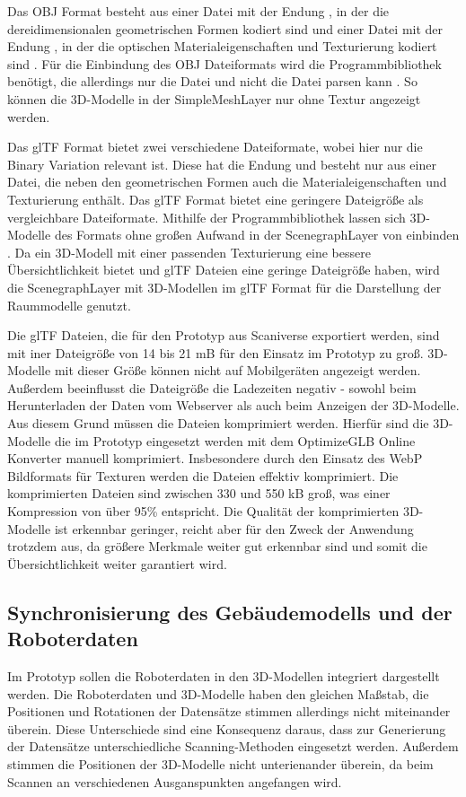 Das \ac{OBJ} Format besteht aus einer Datei mit der Endung \obj{}, in der die dereidimensionalen geometrischen Formen kodiert sind \cite{OBJSpec} und einer Datei mit der Endung \mtl{}, in der die optischen Materialeigenschaften und Texturierung kodiert sind \cite{MTLSpec}. Für die Einbindung des \ac{OBJ} Dateiformats wird die \loadersgl{} Programmbibliothek benötigt, die allerdings nur die \obj Datei und nicht die \mtl{} Datei parsen kann \cite{OBJLoader}. So können die 3D-Modelle in der SimpleMeshLayer nur ohne Textur angezeigt werden.

Das \ac{glTF} Format bietet zwei verschiedene Dateiformate, wobei hier nur die Binary Variation relevant ist. Diese hat die Endung \glb{} und besteht nur aus einer Datei, die neben den geometrischen Formen auch die Materialeigenschaften und Texturierung enthält. Das \ac{glTF} Format bietet eine geringere Dateigröße als vergleichbare Dateiformate.\cite[Abschnitt 2]{glTFSpec} Mithilfe der \loadersgl{} Programmbibliothek lassen sich 3D-Modelle des Formats ohne großen Aufwand in der ScenegraphLayer von \deckgl{} einbinden \cite{DeckglScenegraphLayer}. Da ein 3D-Modell mit einer passenden Texturierung eine bessere Übersichtlichkeit bietet und \ac{glTF} Dateien eine geringe Dateigröße haben, wird die ScenegraphLayer mit 3D-Modellen im \ac{glTF} Format für die Darstellung der Raummodelle genutzt.

Die \ac{glTF} Dateien, die für den Prototyp aus Scaniverse exportiert werden, sind mit iner Dateigröße von 14 bis 21 \ac{mB} für den Einsatz im Prototyp zu groß. 3D-Modelle mit dieser Größe können nicht auf Mobilgeräten angezeigt werden. Außerdem beeinflusst die Dateigröße die Ladezeiten negativ - sowohl beim Herunterladen der Daten vom Webserver als auch beim Anzeigen der 3D-Modelle. Aus diesem Grund müssen die Dateien komprimiert werden. Hierfür sind die 3D-Modelle die im Prototyp eingesetzt werden mit dem OptimizeGLB Online Konverter manuell komprimiert. Insbesondere durch den Einsatz des \ac{WebP} Bildformats für Texturen werden die Dateien effektiv komprimiert.\cite{OptimizeGLB} Die komprimierten Dateien sind zwischen 330 und 550 \ac{kB} groß, was einer Kompression von über 95\% entspricht. Die Qualität der komprimierten 3D-Modelle ist erkennbar geringer, reicht aber für den Zweck der Anwendung trotzdem aus, da größere Merkmale weiter gut erkennbar sind und somit die Übersichtlichkeit weiter garantiert wird.

\subsection{Synchronisierung des Gebäudemodells und der Roboterdaten}
Im Prototyp sollen die Roboterdaten in den 3D-Modellen integriert dargestellt werden. Die Roboterdaten und 3D-Modelle haben den gleichen Maßstab, die Positionen und Rotationen der Datensätze stimmen allerdings nicht miteinander überein. Diese Unterschiede sind eine Konsequenz daraus, dass zur Generierung der Datensätze unterschiedliche Scanning-Methoden eingesetzt werden. Außerdem stimmen die Positionen der 3D-Modelle nicht unterienander überein, da beim Scannen an verschiedenen Ausganspunkten angefangen wird.

